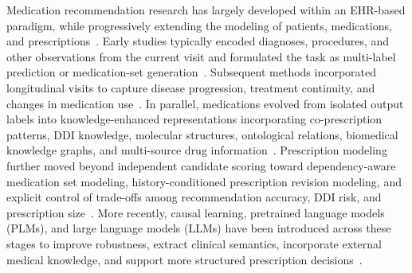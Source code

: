 \documentclass[manuscript,review]{acmart}
\begin{document}

Medication recommendation research has largely developed within an EHR-based paradigm, while progressively extending the modeling of patients, medications, and prescriptions~\cite{ali2023deep}. Early studies typically encoded diagnoses, procedures, and other observations from the current visit and formulated the task as multi-label prediction or medication-set generation~\cite{zhang2017leap}. Subsequent methods incorporated longitudinal visits to capture disease progression, treatment continuity, and changes in medication use~\cite{choi2016retain,shang2019gamenet,wu2022cognet}. In parallel, medications evolved from isolated output labels into knowledge-enhanced representations incorporating co-prescription patterns, DDI knowledge, molecular structures, ontological relations, biomedical knowledge graphs, and multi-source drug information~\cite{shang2019gamenet,yang2021safedrug,yang2023molerec}. Prescription modeling further moved beyond independent candidate scoring toward dependency-aware medication set modeling, history-conditioned prescription revision modeling, and explicit control of trade-offs among recommendation accuracy, DDI risk, and prescription size~\cite{wu2022cognet,sun2022debiased,yang2021safedrug}. More recently, causal learning, pretrained language models (PLMs), and large language models (LLMs) have been introduced across these stages to improve robustness, extract clinical semantics, incorporate external medical knowledge, and support more structured prescription decisions~\cite{sun2022debiased,liu2024leader,xu2025kellm}.

\end{document}
